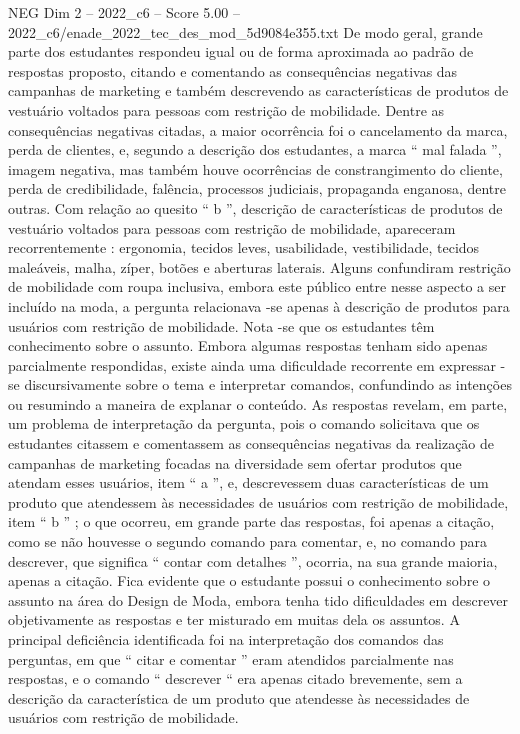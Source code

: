 \begin{textsample}{NEG Dim 2 – 2022\_c6 – Score 5.00 – 2022\_c6/enade\_2022\_tec\_des\_mod\_5d9084e355.txt}
De modo geral, grande parte dos estudantes respondeu igual ou de forma aproximada ao padrão de respostas proposto, citando e comentando as consequências negativas das campanhas de marketing e também descrevendo as características de produtos de vestuário voltados para pessoas com restrição de mobilidade.
Dentre as consequências negativas citadas, a maior ocorrência foi o cancelamento da marca, perda de clientes, e, segundo a descrição dos estudantes, a marca “ mal falada ”, imagem negativa, mas também houve ocorrências de constrangimento do cliente, perda de credibilidade, falência, processos judiciais, propaganda enganosa, dentre outras.
Com relação ao quesito “ b ”, descrição de características de produtos de vestuário voltados para pessoas com restrição de mobilidade, apareceram recorrentemente : ergonomia, tecidos leves, usabilidade, vestibilidade, tecidos maleáveis, malha, zíper, botões e aberturas laterais.
Alguns confundiram restrição de mobilidade com roupa inclusiva, embora este público entre nesse aspecto a ser incluído na moda, a pergunta relacionava -se apenas à descrição de produtos para usuários com restrição de mobilidade.
Nota -se que os estudantes têm conhecimento sobre o assunto.
Embora algumas respostas tenham sido apenas parcialmente respondidas, existe ainda uma dificuldade recorrente em expressar -se discursivamente sobre o tema e interpretar comandos, confundindo as intenções ou resumindo a maneira de explanar o conteúdo.
As respostas revelam, em parte, um problema de interpretação da pergunta, pois o comando solicitava que os estudantes citassem e comentassem as consequências negativas da realização de campanhas de marketing focadas na diversidade sem ofertar produtos que atendam esses usuários, item “ a ”, e, descrevessem duas características de um produto que atendessem às necessidades de usuários com restrição de mobilidade, item “ b ” ; o que ocorreu, em grande parte das respostas, foi apenas a citação, como se não houvesse o segundo comando para comentar, e, no comando para descrever, que significa “ contar com detalhes ”, ocorria, na sua grande maioria, apenas a citação.
Fica evidente que o estudante possui o conhecimento sobre o assunto na área do Design de Moda, embora tenha tido dificuldades em descrever objetivamente as respostas e ter misturado em muitas dela os assuntos.
A principal deficiência identificada foi na interpretação dos comandos das perguntas, em que “ citar e comentar ” eram atendidos parcialmente nas respostas, e o comando “ descrever “ era apenas citado brevemente, sem a descrição da característica de um produto que atendesse às necessidades de usuários com restrição de mobilidade.

\end{textsample}
